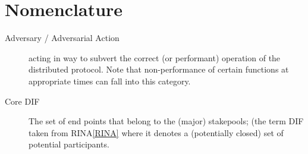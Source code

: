 \documentclass{report}
\theoremstyle{definition}{
  \newtheorem{lemma}{Lemma}[section] %
  \newtheorem{definition}[lemma]{Definition}
}
\theoremstyle{theorem}{
  \newtheorem{invariant}[lemma]{Invariant}
  \newtheorem{proofobligation}[lemma]{Proof Obligation}
}
\numberwithin{equation}{lemma}
\begin{document}
\section{Nomenclature}
\begin{description}
\item[Adversary / Adversarial Action] acting in way to subvert the
  correct (or performant) operation of the distributed protocol. Note
  that non-performance of certain functions at appropriate times can
  fall into this category.
\item[Core DIF] The set of end points that belong to the (major)
  stakepools; (the term DIF taken from RINA\ref{RINA} where it denotes
  a (potentially closed) set of potential participants.
\end{description}
\end{document}
